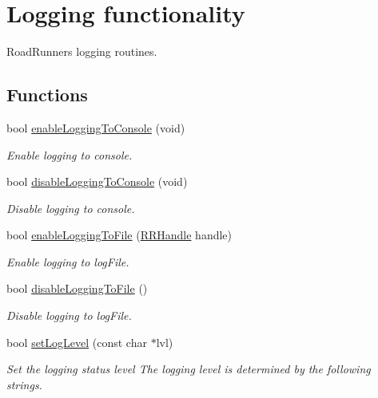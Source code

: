 \hypertarget{group__logging}{\section{Logging functionality}
\label{group__logging}
}


Road\-Runners logging routines.  


\subsection*{Functions}
\begin{DoxyCompactItemize}
\item 
bool \hyperlink{group__logging_ga1289bf0c4cc9c078d53d82b60e8dbdbb}{enable\-Logging\-To\-Console} (void)
\begin{DoxyCompactList}\small\item\em Enable logging to console. \end{DoxyCompactList}\item 
bool \hyperlink{group__logging_ga894d611c74147f5cd1dcb64c1a758b5e}{disable\-Logging\-To\-Console} (void)
\begin{DoxyCompactList}\small\item\em Disable logging to console. \end{DoxyCompactList}\item 
bool \hyperlink{group__logging_ga85cc1f6f174a51a4498b4a44313e8d18}{enable\-Logging\-To\-File} (\hyperlink{rrc__types_8h_a1d68f0592372208fa5a5f2799ea4b3ae}{R\-R\-Handle} handle)
\begin{DoxyCompactList}\small\item\em Enable logging to log\-File. \end{DoxyCompactList}\item 
bool \hyperlink{group__logging_gac1f91b27feb5ffdb19c6d54f3013d7e0}{disable\-Logging\-To\-File} ()
\begin{DoxyCompactList}\small\item\em Disable logging to log\-File. \end{DoxyCompactList}\item 
bool \hyperlink{group__logging_gad113b4e32a079d7a8c1d188561e1ffbc}{set\-Log\-Level} (const char $\ast$lvl)
\begin{DoxyCompactList}\small\item\em Set the logging status level The logging level is determined by the following strings. \end{DoxyCompactList}\item 

\end{DoxyCompactItemize}
